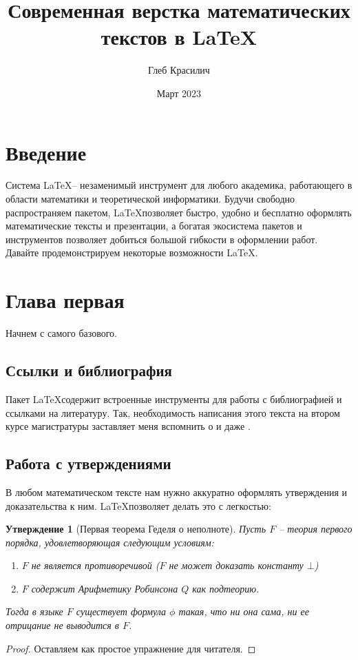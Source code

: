 \documentclass[a4paper,12pt]{article}
\newtheorem{statement}{Утверждение}[section]
\begin{document}
\author{Глеб Красилич}
\title{Современная верстка математических текстов в \LaTeX}
\date{Март 2023}
\maketitle

\tableofcontents


\section*{Введение}
Система \LaTeX -- незаменимый инструмент для любого академика,
работающего в области математики и теоретической информатики.
Будучи свободно распространяем пакетом, \LaTeX позволяет быстро, удобно и бесплатно
оформлять математические тексты и презентации, а богатая экосистема
пакетов и инструментов позволяет добиться большой гибкости в оформлении
работ. Давайте продемонстрируем некоторые возможности \LaTeX.

\section{Глава первая}

Начнем с самого базового.

\subsection{Ссылки и библиография}

Пакет \LaTeX содержит встроенные инструменты для работы с библиографией
и ссылками на литературу. Так, необходимость написания этого текста
на втором курсе магистратуры заставляет меня вспомнить о \cite{process}
и даже \cite{lovecraft}.

\subsection{Работа с утверждениями}

В любом математическом тексте нам нужно аккуратно оформлять утверждения
и доказательства к ним. \LaTeX позволяет делать это с легкостью:

\begin{statement}[Первая теорема Геделя о неполноте]
Пусть $F$ -- теория первого порядка, удовлетворяющая следующим
условиям:
\begin{enumerate}
    \item $F$ не является противоречивой ($F$ не может доказать константу $\bot$) 
    \item $F$ содержит Арифметику Робинсона $Q$ как подтеорию.
\end{enumerate}
Тогда в языке $F$ существует формула $\phi$ такая, что ни она сама,
ни ее отрицание не выводится в $F$.
\end{statement}
\begin{proof}
    Оставляем как простое упражнение для читателя.
\end{proof}
\end{document}
